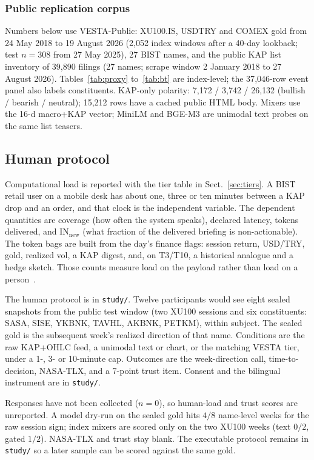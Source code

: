 \documentclass{llncs}
\begin{document}
\subsubsection{Public replication corpus}
Numbers below use VESTA-Public: XU100.IS, USDTRY and COMEX gold from 24 May 2018 to 19 August 2026 (2{,}052 index windows after a 40-day lookback; test $n=308$ from 27 May 2025), 27 BIST names, and the public KAP list inventory of 39{,}890 filings (27 names; scrape window 2 January 2018 to 27 August 2026). Tables~\ref{tab:proxy} to~\ref{tab:bt} are index-level; the 37{,}046-row event panel also labels constituents. KAP-only polarity: 7{,}172 / 3{,}742 / 26{,}132 (bullish / bearish / neutral); 15{,}212 rows have a cached public HTML body. Mixers use the 16-d macro+KAP vector; MiniLM and BGE-M3 are unimodal text probes on the same list teasers.

\subsection{Human protocol}
\label{sec:user}
Computational load is reported with the tier table in Sect.~\ref{sec:tiers}. A BIST retail user on a mobile desk has about one, three or ten minutes between a KAP drop and an order, and that clock is the independent variable. The dependent quantities are coverage (how often the system speaks), declared latency, tokens delivered, and $\mathrm{IN}_{\mathrm{new}}$ (what fraction of the delivered briefing is non-actionable). The token bags are built from the day's finance flags: session return, USD/TRY, gold, realized vol, a KAP digest, and, on T3/T10, a historical analogue and a hedge sketch. Those counts measure load on the payload rather than load on a person~\cite{gajos2006exploring,findlater2009adaptive}.

The human protocol is in \texttt{study/}. Twelve participants would see eight sealed snapshots from the public test window (two XU100 sessions and six constituents: SASA, SISE, YKBNK, TAVHL, AKBNK, PETKM), within subject. The sealed gold is the subsequent week's realized direction of that name. Conditions are the raw KAP+OHLC feed, a unimodal text or chart, or the matching VESTA tier, under a 1-, 3- or 10-minute cap. Outcomes are the week-direction call, time-to-decision, NASA-TLX, and a 7-point trust item. Consent and the bilingual instrument are in \texttt{study/}.

Responses have not been collected ($n=0$), so human-load and trust scores are unreported. A model dry-run on the sealed gold hits $4/8$ name-level weeks for the raw session sign; index mixers are scored only on the two XU100 weeks (text $0/2$, gated $1/2$). NASA-TLX and trust stay blank. The executable protocol remains in \texttt{study/} so a later sample can be scored against the same gold.
\end{document}
